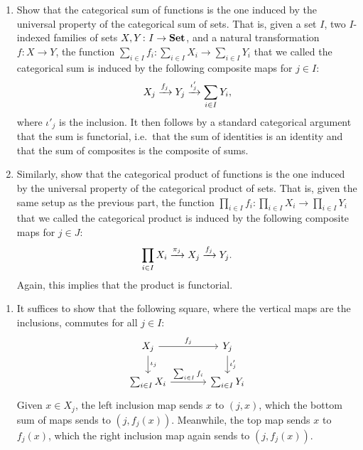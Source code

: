 \documentclass[Book-Poly]{subfiles}
\begin{document}
\begin{exercise} \label{exc.sum-prod-func}
    \begin{enumerate}
        \item Show that the categorical sum of functions is the one induced by the universal property of the categorical sum of sets.
        That is, given a set $I$, two $I$-indexed families of sets $X,Y\colon I\to\mathbf{Set}$, and a natural transformation $f\colon X\to Y$, the function $\sum_{i\in I}f_i\colon\sum_{i\in I}X_i\to\sum_{i\in I}Y_i$ that we called the categorical sum is induced by the following composite maps for $j\in I$:
        \[
        X_j\xrightarrow{f_j}Y_j\xrightarrow{\iota'_j}\sum_{i\in I}Y_i,
        \]
        where $\iota'_j$ is the inclusion.
        It then follows by a standard categorical argument that the sum is functorial, i.e.\ that the sum of identities is an identity and that the sum of composites is the composite of sums.

        \item Similarly, show that the categorical product of functions is the one induced by the universal property of the categorical product of sets.
        That is, given the same setup as the previous part, the function $\prod_{i\in I}f_i\colon\prod_{i\in I}X_i\to\prod_{i\in I}Y_i$ that we called the categorical product is induced by the following composite maps for $j\in J$:
        \[
        \prod_{i\in I}X_i\xrightarrow{\pi_j}X_j\xrightarrow{f_j}Y_j.
        \]
        Again, this implies that the product is functorial. \qedhere
    \end{enumerate}
    \begin{solution}
        \begin{enumerate}
            \item It suffices to show that the following square, where the vertical maps are the inclusions, commutes for all $j\in I$:
            \[
            \begin{tikzcd}[column sep=large]
                X_j \ar[d, "\iota_j"] \ar[r, "f_j"] & Y_j \ar[d, "\iota'_j"] \\
                \sum_{i\in I}X_i \ar[r, "\sum_{i\in I}f_i"] & \sum_{i\in I}Y_i
            \end{tikzcd}
            \]
            Given $x\in X_j$, the left inclusion map sends $x$ to $(j,x)$, which the bottom sum of maps sends to $(j,f_j(x))$.
            Meanwhile, the top map sends $x$ to $f_j(x)$, which the right inclusion map again sends to $(j,f_j(x))$.


\end{enumerate}
\end{solution}
\end{exercise}
\end{document}
